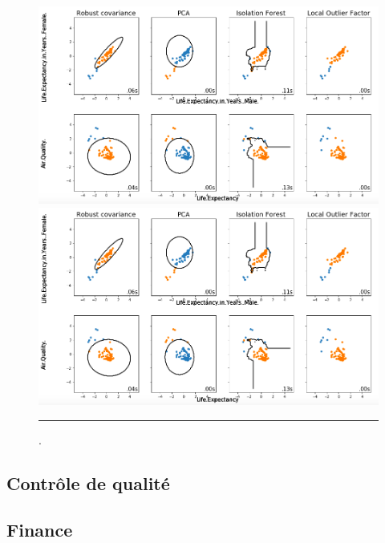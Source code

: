 \begin{figure}[t]
    \centering
    \includegraphics[width=\textwidth]{ADOA/Images/Allcomp1.png}
   \includegraphics[width=\textwidth]{ADOA/Images/Allcomp1.png}

    \caption{.}\hrule
    \label{fig:Cities}
\end{figure}
\subsection{Contrôle de qualité}
\subsection{Finance}


